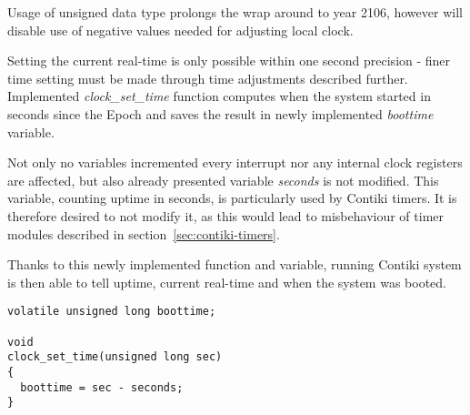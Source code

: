 Usage of unsigned data type prolongs the wrap around to year 2106,
however will disable use of negative values needed for adjusting local clock.

Setting the current real-time is only possible within one second precision -
finer time setting must be made through time adjustments described further.
Implemented {\it{clock\_set\_time}} function computes when the system started
in seconds since the Epoch and saves the result in newly implemented {\it{boottime}} variable.

Not only no variables incremented every interrupt nor any internal clock registers
are affected, but also already presented variable {\it{seconds}} is not modified.
This variable, counting uptime in seconds,
is particularly used by Contiki timers.
It is therefore desired to not modify it, as this would lead to misbehaviour of timer modules
described in section~\ref{sec:contiki-timers}.

Thanks to this newly implemented function and variable,
running Contiki system is then able to tell uptime, current real-time and
when the system was booted.
\begin{lstlisting}
volatile unsigned long boottime;

void
clock_set_time(unsigned long sec)
{
  boottime = sec - seconds;
}
\end{lstlisting}

